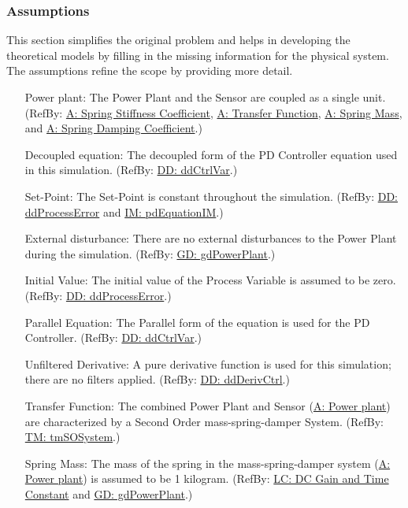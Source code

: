 \documentclass[12pt]{article}
\begin{document}
\subsubsection{Assumptions}
\label{Sec:Assumps}
This section simplifies the original problem and helps in developing the theoretical models by filling in the missing information for the physical system. The assumptions refine the scope by providing more detail.

\begin{itemize}
\item[Power plant:\phantomsection\label{pwrPlant}]{The Power Plant and the Sensor are coupled as a single unit. (RefBy: \hyperref[stiffnessCoeffSpring]{A: Spring Stiffness Coefficient}, \hyperref[pwrPlantTxFnx]{A: Transfer Function}, \hyperref[massSpring]{A: Spring Mass}, and \hyperref[dampingCoeffSpring]{A: Spring Damping Coefficient}.)}
\item[Decoupled equation:\phantomsection\label{decoupled}]{The decoupled form of the PD Controller equation used in this simulation. (RefBy: \hyperref[DD:ddCtrlVar]{DD: ddCtrlVar}.)}
\item[Set-Point:\phantomsection\label{setPoint}]{The Set-Point is constant throughout the simulation. (RefBy: \hyperref[DD:ddProcessError]{DD: ddProcessError} and \hyperref[IM:pdEquationIM]{IM: pdEquationIM}.)}
\item[External disturbance:\phantomsection\label{externalDisturb}]{There are no external disturbances to the Power Plant during the simulation. (RefBy: \hyperref[GD:gdPowerPlant]{GD: gdPowerPlant}.)}
\item[Initial Value:\phantomsection\label{initialValue}]{The initial value of the Process Variable is assumed to be zero. (RefBy: \hyperref[DD:ddProcessError]{DD: ddProcessError}.)}
\item[Parallel Equation:\phantomsection\label{parallelEq}]{The Parallel form of the equation is used for the PD Controller. (RefBy: \hyperref[DD:ddCtrlVar]{DD: ddCtrlVar}.)}
\item[Unfiltered Derivative:\phantomsection\label{unfilteredDerivative}]{A pure derivative function is used for this simulation; there are no filters applied. (RefBy: \hyperref[DD:ddDerivCtrl]{DD: ddDerivCtrl}.)}
\item[Transfer Function:\phantomsection\label{pwrPlantTxFnx}]{The combined Power Plant and Sensor (\hyperref[pwrPlant]{A: Power plant}) are characterized by a Second Order mass-spring-damper System. (RefBy: \hyperref[TM:tmSOSystem]{TM: tmSOSystem}.)}
\item[Spring Mass:\phantomsection\label{massSpring}]{The mass of the spring in the mass-spring-damper system (\hyperref[pwrPlant]{A: Power plant}) is assumed to be 1 kilogram. (RefBy: \hyperref[likeChgPP]{LC: DC Gain and Time Constant} and \hyperref[GD:gdPowerPlant]{GD: gdPowerPlant}.)}

\end{itemize}
\end{document}
